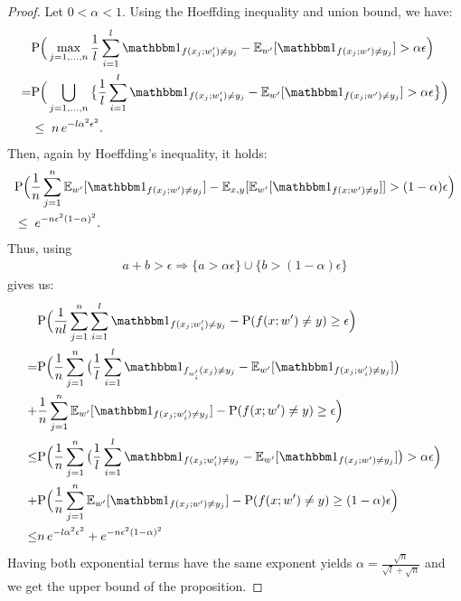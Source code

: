{\small
\begin{proof}
Let $0<\alpha<1$. Using the Hoeffding inequality and union bound, we have:
\begin{align*}
	&\Pr\Big(\maxop_{j=1,\ldots,n} \frac{1}{l}\sum_{i=1}^l \Id_{f(x_j; w'_i)\neq y_j} - \Exp_{w'}[\Id_{f(x_j; w')\neq y_j}] > \alpha\epsilon\Big) \\
	=& \Pr\Big(\bigcup_{j=1,\ldots,n}\big\{ \frac{1}{l}\sum_{i=1}^l \Id_{f(x_j; w'_i)\neq y_j} - \Exp_{w'}[\Id_{f(x_j; w')\neq y_j}] > \alpha\epsilon\big\}\Big)\\
	&\leq \; n\, e^{-l\alpha^2 \epsilon^2}.
\end{align*}
Then, again by Hoeffding's inequality, it holds:
\begin{align*}
	&\Pr\Big( \frac{1}{n}\sum_{j=1}^n \Exp_{w'}[\Id_{f(x_j; w')\neq y_j}]
	- \Exp_{x,y}[\Exp_{w'}[\Id_{f(x; w')\neq y}]] > (1-\alpha) \epsilon \Big)\\
	&\leq \; e^{-n\epsilon^2 (1-\alpha)^2}.
\end{align*}
Thus, using
\begin{align*}
	a + b>\epsilon \Longrightarrow \{a > \alpha \epsilon\} \cup \{b > (1-\alpha)\epsilon\}
\end{align*}
gives us:
\begin{align*}
	&\Pr\Big( \frac{1}{nl}\sum_{j=1}^n \sum_{i=1}^l \Id_{f(x_j; w'_i)\neq y_j} - \Pr( f(x; w')\neq y)\geq \epsilon\Big)\\
	=& \Pr\Big( \frac{1}{n}\sum_{j=1}^n \big(\frac{1}{l}\sum_{i=1}^l \Id_{f_{w'_i}(x_j)\neq y_j} - \Exp_{w'}[\Id_{f(x_j; w'_i)\neq y_j}]\big)\\
	 +& \frac{1}{n}\sum_{j=1}^n \Exp_{w'}[\Id_{f(x_j; w'_i)\neq y_j}] - \Pr( f(x; w')\neq y)\geq \epsilon\Big)\\
	\leq & \Pr\Big( \frac{1}{n}\sum_{j=1}^n \big(\frac{1}{l}\sum_{i=1}^l \Id_{f(x_j; w'_i)\neq y_j} - \Exp_{w'}[\Id_{f(x_j; w')\neq y_j}]\big)>\alpha \epsilon\Big)\\
	+& \Pr\Big( \frac{1}{n}\sum_{j=1}^n \Exp_{w'}[\Id_{f(x_j; w')\neq y_j}] - \Pr( f(x; w')\neq y)\geq (1-\alpha)\epsilon\Big)\\
	\leq &  n\, e^{-l\alpha^2 \epsilon^2} + e^{-n\epsilon^2 (1-\alpha)^2} 
\end{align*}
Having both exponential terms have the same exponent yields $\alpha=\frac{\sqrt{n}}{\sqrt{l}+\sqrt{n}}$ and we get the upper bound of the proposition.
\end{proof}
}

